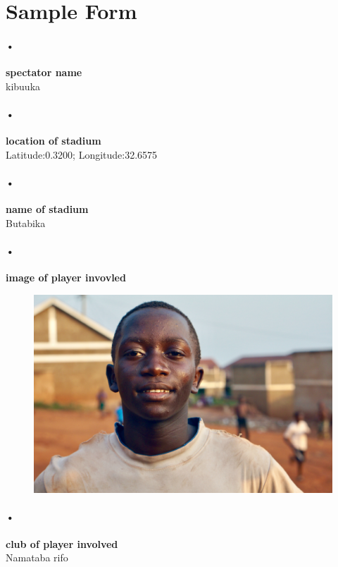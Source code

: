 \documentclass[12pt]{article}
\begin{document}
\section{Sample Form}
\paragraph{•}
\textbf{spectator name  }\\
kibuuka

\paragraph{•}
\textbf{location of stadium }\\
Latitude:0.3200; Longitude:32.6575

\paragraph{•}
\textbf{name of stadium }\\
Butabika


\paragraph{•}
\textbf{image of player invovled}\\
\begin{figure}
		\includegraphics[scale=0.5]{odene.jpg} 
			\end{figure}


\paragraph{•}
\textbf{club of player involved}\\
Namataba rifo
\end{document}
